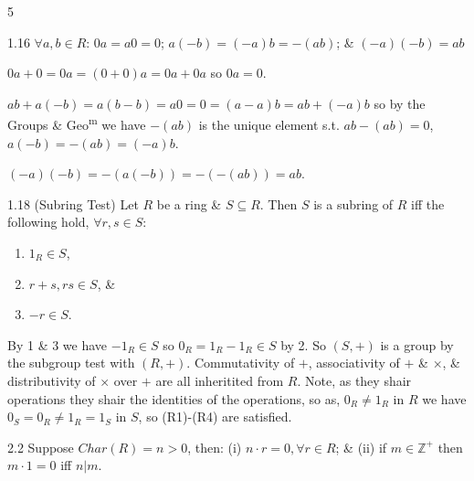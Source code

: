 \documentclass[8pt]{extarticle}
\makeatletter
\renewenvironment{proof}[1][\proofname]{%
  \par%
  \pushQED{\qed}%
  \normalfont
  \topsep=2pt\partopsep=0pt\parsep=0pt\itemsep=0pt%
  \trivlist
  \item[\hskip\labelsep\itshape #1\@addpunct{.}]\ignorespaces
}{%
  \popQED\endtrivlist\@endpefalse
  \vspace{-1pt}%
}
\makeatother
\begin{document}
\begin{multicols*}{5}
        \begin{lemma}{1.16}
            \(\forall a,b\in R\): \(0a=a0=0\); \(a(-b)=(-a)b=-(ab)\); \& \((-a)(-b)=ab\)
        \end{lemma}

        \begin{proof}
            \(0a+0=0a=(0+0)a=0a+0a\) so \(0a=0\).
            
            \(ab+a(-b)=a(b-b)=a0=0=(a-a)b=ab+(-a)b\) so by the Groups \& Geo\textsuperscript{m} we have \(-(ab)\) is the unique element s.t. \(ab-(ab)=0\), \(a(-b)=-(ab)=(-a)b\).

            \((-a)(-b)=-(a(-b))=-(-(ab))=ab\).
        \end{proof}

        \begin{lemma}{1.18}
            (Subring Test) Let \(R\) be a ring \& \(S\subseteq R\). Then \(S\) is a subring of \(R\) iff the following hold, \(\forall r,s\in S\):

            \vspace{-10pt}
            \begin{enumerate}
                \item \(1_R\in S\),
                \vspace{-10pt}
                \item \(r+s,rs\in S\), \& 
                \vspace{-10pt}
                \item \(-r\in S\).
            \end{enumerate}
            \vspace{-10pt}
        \end{lemma}

        \begin{proof}
            By 1 \& 3 we have \(-1_R\in S\) so \(0_R=1_R-1_R\in S\) by 2. So \((S,+)\) is a group by the subgroup test with \((R,+)\).
            Commutativity of \(+\), associativity of \(+\) \& \(\times\), \& distributivity of \(\times\) over \(+\) are all inheritited from \(R\).
            Note, as they shair operations they shair the identities of the operations, so as, \(0_R\ne1_R\) in \(R\) we have \(0_S=0_R\ne 1_R=1_S\) in \(S\), so (R1)-(R4) are satisfied.
        \end{proof}

        \begin{lemma}{2.2}
            Suppose \(Char(R)=n>0\), then: (i) \(n\cdot r=0, \forall r\in R\); \& (ii) if \(m\in\mathbb{Z}^+\) then \(m\cdot 1=0\) iff \(n|m\).
        \end{lemma}
        


\end{multicols*}
\end{document}
